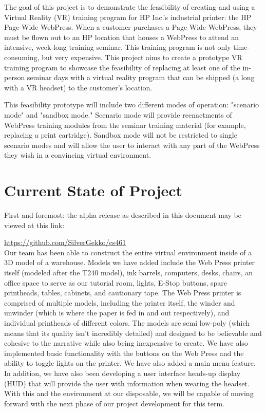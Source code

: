 \documentclass[onecolumn, draftclsnofoot,10pt, compsoc]{IEEEtran}
\begin{document}
The goal of this project is to demonstrate the feasibility of creating and using a Virtual Reality (VR) training program for HP Inc.'s industrial printer: the HP Page-Wide WebPress. When a customer purchases a Page-Wide WebPress, they must be flown out to an HP location that houses a WebPress to attend an intensive, week-long training seminar. This training program is not only time-consuming, but very expensive. This project aims to create a prototype VR training program to showcase the feasibility of replacing at least one of the in-person seminar days with a virtual reality program that can be shipped (a long with a VR headset) to the customer's location.

This feasibility prototype will include two different modes of operation: "scenario mode" and "sandbox mode." Scenario mode will provide reenactments of WebPress training modules from the seminar training material (for example, replacing a print cartridge). Sandbox mode will not be restricted to single scenario modes and will allow the user to interact with any part of the WebPress they wish in a convincing virtual environment.

\section{Current State of Project}

First and foremost: the alpha release as described in this document may be viewed at this link: 

\noindent
\href{https://github.com/SilverGekko/cs461}{https://github.com/SilverGekko/cs461}\\

\noindent
Our team has been able to construct the entire virtual environment inside of a 3D model of a warehouse. Models we have added include the Web Press printer itself (modeled after the T240 model), ink barrels, computers, desks, chairs, an office space to serve as our tutorial room, lights, E-Stop buttons, spare printheads, tables, cabinets, and cautionary tape. The Web Press printer is comprised of multiple models, including the printer itself, the winder and unwinder (which is where the paper is fed in and out respectively), and individual printheads of different colors. The models are semi low-poly (which means that its quality isn't incredibly detailed) and designed to be believable and cohesive to the narrative while also being inexpensive to create. We have also implemented basic functionality with the buttons on the Web Press and the ability to toggle lights on the printer. We have also added a main menu feature. In addition, we have also been developing a user interface heads-up display (HUD) that will provide the user with information when wearing the headset. With this and the environment at our disposable, we will be capable of moving forward with the next phase of our project development for this term. 
\end{document}
